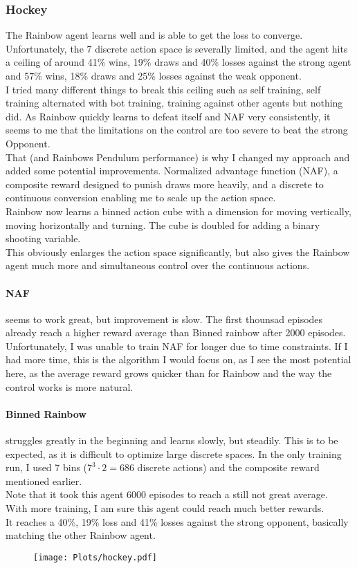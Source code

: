 \subsubsection{Hockey}
The Rainbow agent learns well and is able to get the loss to converge. Unfortunately, the 7 discrete action space is severally limited, and the agent hits a ceiling of around 41\% wins, 19\% draws and 40\% losses against the strong agent and 57\% wins, 18\% draws and 25\% losses against the weak opponent.\\
I tried many different things to break this ceiling such as self training, self training alternated with bot training, training against other agents but nothing did.
As Rainbow quickly learns to defeat itself and NAF very consistently, it seems to me that the limitations on the control are too severe to beat the strong Opponent.\\
That (and Rainbows Pendulum performance) is why I changed my approach and added some potential improvements. Normalized advantage function (NAF), a composite reward designed to punish draws more heavily, and a discrete to continuous conversion enabling me to scale up the action space.\\
Rainbow now learns a binned action cube with a dimension for moving vertically, moving horizontally and turning. The cube is doubled for adding a binary shooting variable.\\
This obviously enlarges the action space significantly, but also gives the Rainbow agent much more and simultaneous control over the continuous actions.\\

\paragraph{NAF} seems to work great, but improvement is slow. The first thounsad episodes already reach a higher reward average than Binned rainbow after 2000 episodes.
Unfortunately, I was unable to train NAF for longer due to time constraints.
If I had more time, this is the algorithm I would focus on, as I see the most potential here, as the average reward grows quicker than for Rainbow and the way the control works is more natural.
\paragraph{Binned Rainbow} struggles greatly in the beginning and learns slowly, but steadily. This is to be expected, as it is difficult to optimize large discrete spaces.
In the only training run, I used 7 bins ($7^3\cdot 2 = 686$ discrete actions) and the composite reward mentioned earlier.\\
Note that it took this agent 6000 episodes to reach a still not great average.\\
With more training, I am sure this agent could reach much better rewards.\\
It reaches a 40\%, 19\% loss and 41\% losses against the strong opponent, basically matching the other Rainbow agent.\\
\begin{figure}[h]
    \centering
    \texttt{[image: Plots/hockey.pdf]}
\end{figure}